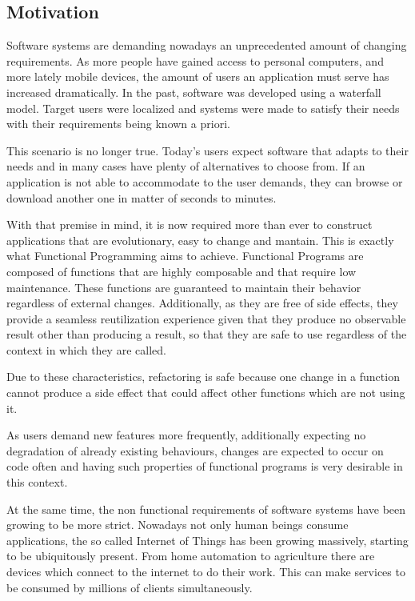 \documentclass[../main.tex]{subfiles}
\begin{document}
\subsection{Motivation}
Software systems are demanding nowadays an unprecedented amount of changing
requirements. As more people have gained access to personal computers, and more
lately mobile devices, the amount of users an application must serve has
increased dramatically. In the past, software was developed using a waterfall model.
Target users were localized and systems were made to satisfy their needs with
their requirements being known a priori.

This scenario is no longer true. Today's users expect software that adapts to their
needs and in many cases have plenty of alternatives to choose from. If an application
is not able to accommodate to the user demands, they can browse or
download another one in matter of seconds to minutes.

With that premise in mind, it is now required more than ever to construct applications that are
evolutionary, easy to change and mantain. This is exactly what
Functional Programming aims to achieve. Functional Programs are composed of
functions that are highly composable and that require low maintenance. These
functions are guaranteed to maintain their behavior regardless of external
changes. Additionally, as they are free of side effects, they provide a seamless
reutilization experience given that they produce no observable result other than
producing a result, so that they are safe to use regardless of the context in which
they are called.

Due to these characteristics, refactoring is safe because one change in a function
cannot produce a side effect that could affect other functions which are not using
it.

As users demand new features more frequently, additionally expecting no degradation of already
existing behaviours, changes are expected to occur on code often and having such
properties of functional programs is very desirable in this context.

At the same time, the non functional requirements of software systems have been
growing to be more strict. Nowadays not only human beings consume applications,
the so called Internet of Things has been growing massively, starting to be
ubiquitously present. From home automation to agriculture there are devices
which connect to the internet to do their work. This can make services to be
consumed by millions of clients simultaneously.
\end{document}
